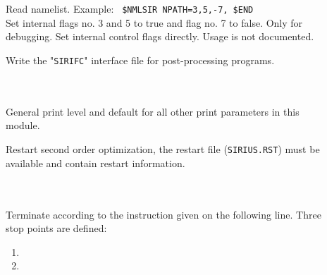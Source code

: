 \begin{description}

\item[] \ \\
   \\
  Read namelist. Example: \verb" $NMLSIR NPATH=3,5,-7, $END" \\
  Set internal flags no. 3 and 5 to true and flag no. 7 to false.
  Only for debugging. Set internal control flags directly.
  Usage is not documented.

\item[]
  Write the "\verb|SIRIFC|" interface file for post-processing programs.


\item[] \ \\
   \\
  General {\sir} print level and default for all other print parameters in this module.

\item[]
  Restart {\sir} second order optimization,
  the {\sir} restart file (\verb|SIRIUS.RST|) must be available and contain restart information.


\item[] \ \\
   \\
  Terminate {\sir} according to the instruction given on the following line.
  Three stop points are defined:
\begin{enumerate}

\item \hspace{2em} 

\item \hspace{2em} 


\end{enumerate}
\end{description}
